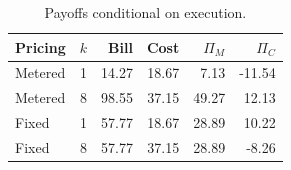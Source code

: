 \begin{table}[t]
\caption{Payoffs conditional on execution.}
\label{tab:retail-payoffs}
\centering\small
\begin{tabular}{@{}lrrrrr@{}}
\toprule
Pricing & $k$ & Bill & Cost & $\Pi_M$ & $\Pi_C$ \\
\midrule
Metered & 1 & 14.27 & 18.67 & 7.13 & -11.54 \\
Metered & 8 & 98.55 & 37.15 & 49.27 & 12.13 \\
Fixed & 1 & 57.77 & 18.67 & 28.89 & 10.22 \\
Fixed & 8 & 57.77 & 37.15 & 28.89 & -8.26 \\
\bottomrule
\end{tabular}
\end{table}
